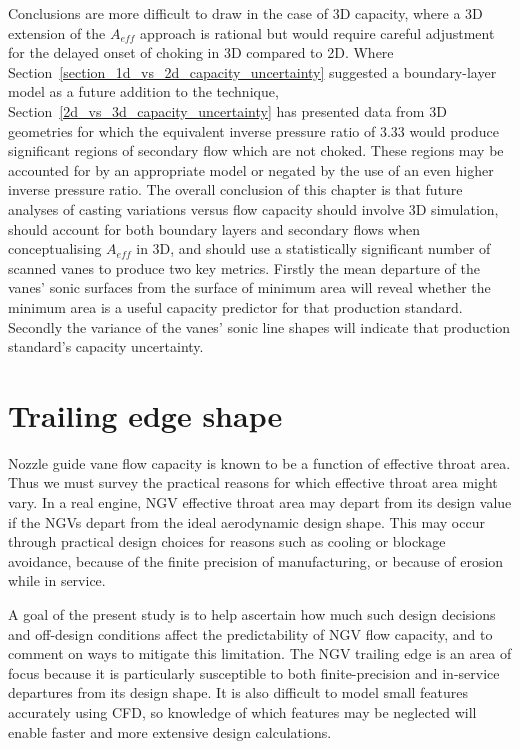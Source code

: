 \documentclass[a4paper, 11pt, oneside]{report}
\begin{document}
Conclusions are more difficult to draw in the case of 3D capacity, where a 3D extension of the $A_{eff}$ approach is rational but would require careful adjustment for the delayed onset of choking in 3D compared to 2D. Where Section~\ref{section_1d_vs_2d_capacity_uncertainty} suggested a boundary-layer model as a future addition to the technique, Section~\ref{2d_vs_3d_capacity_uncertainty} has presented data from 3D geometries for which the equivalent inverse pressure ratio of $3.33$ would produce significant regions of secondary flow which are not choked. These regions may be accounted for by an appropriate model or negated by the use of an even higher inverse pressure ratio. The overall conclusion of this chapter is that future analyses of casting variations versus flow capacity should involve 3D simulation, should account for both boundary layers and secondary flows when conceptualising $A_{eff}$ in 3D, and should use a statistically significant number of scanned vanes to produce two key metrics. Firstly the mean departure of the vanes' sonic surfaces from the surface of minimum area will reveal whether the minimum area is a useful capacity predictor for that production standard. Secondly the variance of the vanes' sonic line shapes will indicate that production standard's capacity uncertainty.



\chapter{Trailing edge shape}
\label{chapter_trailing_edge}

Nozzle guide vane flow capacity is known to be a function of effective throat area. Thus we must survey the practical reasons for which effective throat area might vary. In a real engine, NGV effective throat area may depart from its design value if the NGVs depart from the ideal aerodynamic design shape. This may occur through practical design choices for reasons such as cooling or blockage avoidance, because of the finite precision of manufacturing, or because of erosion while in service. 

A goal of the present study is to help ascertain how much such design decisions and off-design conditions affect the predictability of NGV flow capacity, and to comment on ways to mitigate this limitation. The NGV trailing edge is an area of focus because it is particularly susceptible to both finite-precision and in-service departures from its design shape. It is also difficult to model small features accurately using CFD, so knowledge of which features may be neglected will enable faster and more extensive design calculations.
\end{document}
